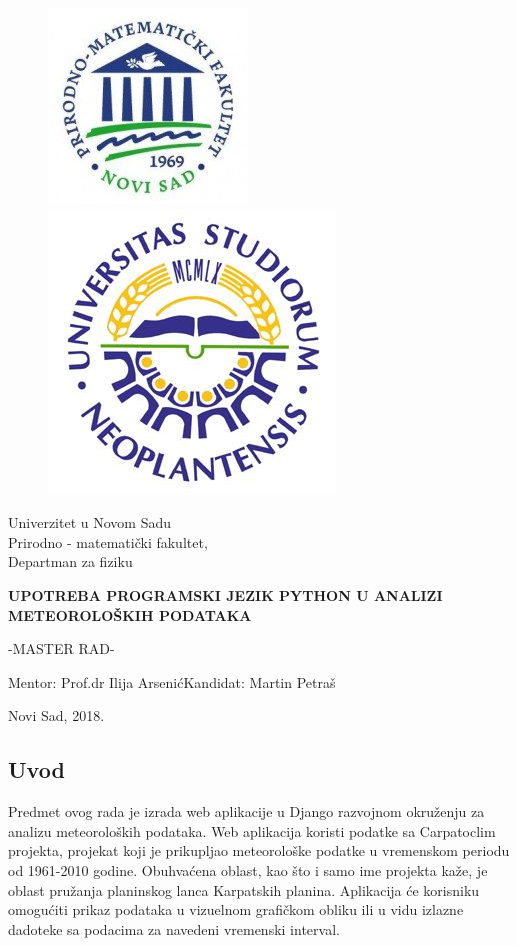 \documentclass[12pt]{article}
\begin{document}
\clearpage

\begin{figure}[h]
\includegraphics[width=0.3\linewidth]{PMF.jpg}
\includegraphics[width=0.3\linewidth,right=10cm]{uns.jpg}
\end{figure}

\begin{center}
{\Large Univerzitet u Novom Sadu\\\Large Prirodno - matematički fakultet,\\ \Large Departman za fiziku}
\end {center}
\begin{center}
\vspace{3.cm}
{\Large  \textbf{UPOTREBA PROGRAMSKI JEZIK PYTHON U ANALIZI METEOROLOŠKIH PODATAKA}}
\end {center}
\vspace{1.cm}
\begin{center}
\Large -MASTER RAD-
\end{center}
\vspace{3cm}
\begin{center}Mentor: Prof.dr Ilija Arsenić\hfill Kandidat: Martin Petraš
\end{center}
\vspace{0.5cm}
\begin{center}
Novi Sad, 2018.
\end{center}
\newpage
\pagebreak
\begin{center}
\tableofcontents
\end{center}
\newpage
\pagebreak
{}

\newpage
\begin{center}
\section*{Uvod}
\end{center}
Predmet ovog rada je izrada web aplikacije u Django razvojnom okruženju za analizu meteoroloških podataka.  Web aplikacija koristi podatke sa Carpatoclim projekta, projekat koji je prikupljao meteorološke podatke u vremenskom periodu od 1961-2010 godine. Obuhvaćena oblast, kao što i samo ime projekta kaže, je oblast  pružanja planinskog lanca Karpatskih planina.  Aplikacija će korisniku omogućiti prikaz podataka u vizuelnom grafičkom obliku ili u vidu izlazne dadoteke sa podacima za  navedeni vremenski interval.
\newpage
\end{document}
